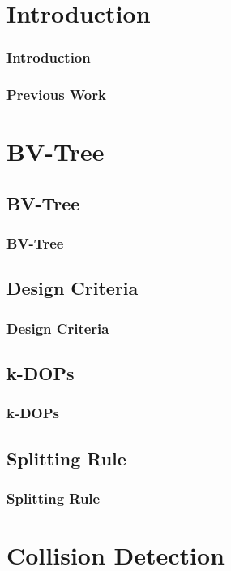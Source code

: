 \documentclass{beamer}
\begin{document}
\section{Introduction}
    \begin{frame}
    \frametitle{Introduction}
    \end{frame}
	
	\begin{frame}
	\frametitle{Previous Work}
	\end{frame}

\section{BV-Tree}

\subsection{BV-Tree}
	\begin{frame}
	\frametitle{BV-Tree}
	\end{frame}

\subsection{Design Criteria}
	\begin{frame}
	\frametitle{Design Criteria}
	\end{frame}

\subsection{k-DOPs}
	\begin{frame}
	\frametitle{k-DOPs}
	\end{frame}

\subsection{Splitting Rule}
	\begin{frame}
	\frametitle{Splitting Rule}
	\end{frame}

\section{Collision Detection}
\end{document}
